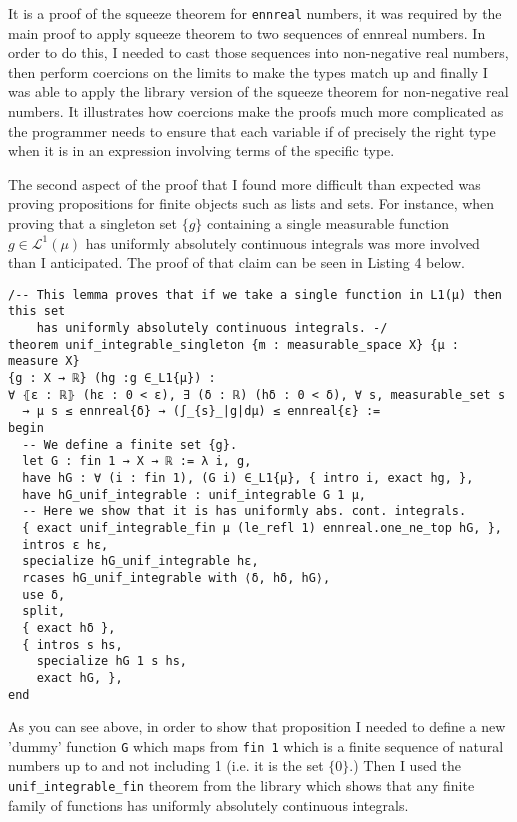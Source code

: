 \documentclass[11pt]{article}
\newenvironment{code}{\captionsetup{type=listing}}{}
\newcommand\Lmu{\mathcal{L}^1(\mu)}
\begin{document}
It is a proof of the squeeze theorem for \texttt{ennreal} numbers, it was required
by the main proof to apply squeeze theorem to two sequences of ennreal numbers. In order
to do this, I needed to cast those sequences into non-negative real numbers,
then perform coercions on the limits to make the types match up and finally
I was able to apply the library version of the squeeze theorem for non-negative
real numbers. It illustrates how coercions make the proofs much more complicated
as the programmer needs to ensure that each variable if of precisely the right
type when it is in an expression involving terms of the specific type.

The second aspect of the proof that I found more difficult than expected was
proving propositions for finite objects such as lists and sets. For instance,
when proving that a singleton set $\lbrace g\rbrace$ containing a single measurable
function  $g \in \Lmu $ has uniformly absolutely continuous integrals was more
involved than I anticipated. The proof of that claim can be seen in Listing 4 below.
\begin{code}
\begin{verbatim}
/-- This lemma proves that if we take a single function in L1(μ) then this set
    has uniformly absolutely continuous integrals. -/
theorem unif_integrable_singleton {m : measurable_space X} {μ : measure X}
{g : X → ℝ} (hg :g ∈_L1{μ}) :
∀ ⦃ε : ℝ⦄ (hε : 0 < ε), ∃ (δ : ℝ) (hδ : 0 < δ), ∀ s, measurable_set s
  → μ s ≤ ennreal{δ} → (∫_{s}_|g|dμ) ≤ ennreal{ε} :=
begin
  -- We define a finite set {g}.
  let G : fin 1 → X → ℝ := λ i, g,
  have hG : ∀ (i : fin 1), (G i) ∈_L1{μ}, { intro i, exact hg, },
  have hG_unif_integrable : unif_integrable G 1 μ,
  -- Here we show that it is has uniformly abs. cont. integrals.
  { exact unif_integrable_fin μ (le_refl 1) ennreal.one_ne_top hG, },
  intros ε hε,
  specialize hG_unif_integrable hε,
  rcases hG_unif_integrable with ⟨δ, hδ, hG⟩,
  use δ,
  split,
  { exact hδ },
  { intros s hs,
    specialize hG 1 s hs,
    exact hG, },
end
\end{verbatim}
\end{code}

As you can see above, in order to show that proposition I needed to define a new
'dummy' function \texttt{G} which maps from \texttt{fin 1} which is a finite sequence
of natural numbers up to and not including 1 (i.e. it is the set $\lbrace 0 \rbrace$.)
Then I used the \texttt{unif\_integrable\_fin} theorem from the library which shows that
any finite family of functions has uniformly absolutely continuous integrals.
\end{document}
